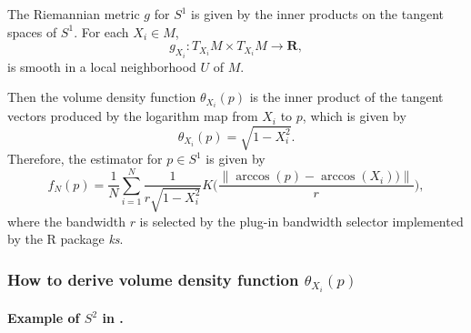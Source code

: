 \documentclass[11pt,a4paper,]{article}
\begin{document}
The Riemannian metric \(g\) for \(S^1\) is given by the inner products on the tangent spaces of \(S^1\). For each \(X_i \in M\),
\[
g_{X_i}: T_{X_i}M \times T_{X_i}M \rightarrow \pmb{R},
\]
is smooth in a local neighborhood \(U\) of \(M\).

Then the volume density function \(\theta_{X_i}(p)\) is the inner product of the tangent vectors produced by the logarithm map from \(X_i\) to \(p\), which is given by
\[
\theta_{X_i}(p) = \sqrt{1 - X_i^2}.
\]
Therefore, the estimator for \(p \in S^1\) is given by
\[
f_N(p) = \frac{1}{N} \sum_{i=1}^{N} \frac{1}{r \sqrt{1 - X_i^2}} K\bigg(\frac{\|\arccos(p) - \arccos(X_i))\|}{r}\bigg),
\]
where the bandwidth \(r\) is selected by the plug-in bandwidth selector implemented by the R package \emph{ks}.

\hypertarget{how-to-derive-volume-density-function-theta_x_ip}{%
\subsubsection{\texorpdfstring{How to derive volume density function \(\theta_{X_i}(p)\)}{How to derive volume density function \textbackslash theta\_\{X\_i\}(p)}}\label{how-to-derive-volume-density-function-theta_x_ip}}

\hypertarget{example-of-s2-in-henry2009-om.}{%
\paragraph{\texorpdfstring{Example of \(S^2\) in \textcite{Henry2009-om}.}{Example of S\^{}2 in @Henry2009-om.}}\label{example-of-s2-in-henry2009-om.}}
\end{document}
